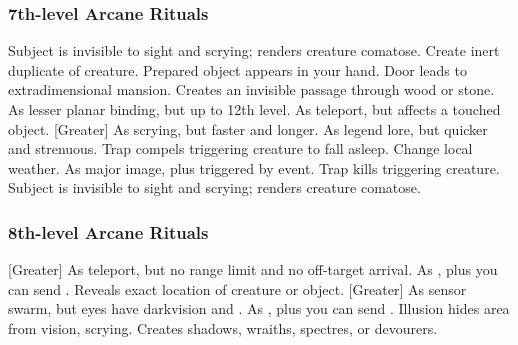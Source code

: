 \subsubsection{7th-level Arcane Rituals}
\begin{rituallist}
     Subject is invisible to sight and scrying; renders creature comatose.
    \M Create inert duplicate of creature.
     Prepared object appears in your hand.
    \F Door leads to extradimensional mansion.
     Creates an invisible passage through wood or stone.
     As lesser planar binding, but up to 12th level.
     As teleport, but affects a touched object.
    [Greater] As scrying, but faster and longer.
     As legend lore, but quicker and strenuous.
     Trap compels triggering creature to fall asleep.
     Change local weather.
     As major image, plus triggered by event.
     Trap kills triggering creature.
     Subject is invisible to sight and scrying; renders creature comatose.
\end{rituallist}

\subsubsection{8th-level Arcane Rituals}
\begin{rituallist}
    [Greater] As teleport, but no range limit and no off-target arrival.
     As , plus you can send .
     Reveals exact location of creature or object.
    [Greater] As sensor swarm, but eyes have darkvision and .
     As , plus you can send .
     Illusion hides area from vision, scrying.
    \M Creates shadows, wraiths, spectres, or devourers.
\end{rituallist}

